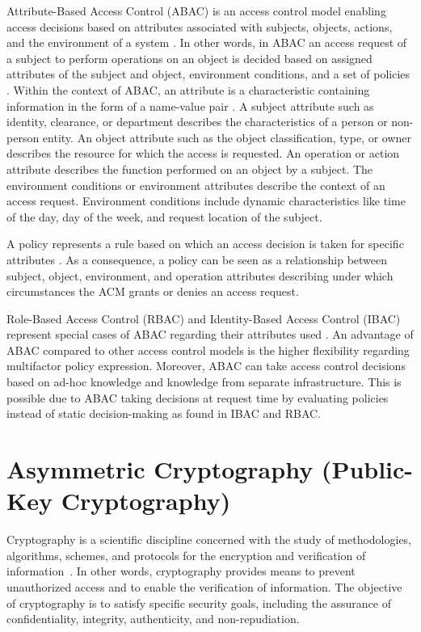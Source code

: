 Attribute-Based Access Control (ABAC) is an access control model enabling access decisions based on attributes associated with subjects, objects, actions, and the environment of a system \cite{JTF2020}.
In other words, in ABAC an access request of a subject to perform operations on an object is decided based on assigned attributes of the subject and object, environment conditions, and a set of policies \cite{Hu2014}.
Within the context of ABAC, an attribute is a characteristic containing information in the form of a name-value pair \cite{Hu2014}.
A subject attribute such as identity, clearance, or department describes the characteristics of a person or non-person entity.
An object attribute such as the object classification, type, or owner describes the resource for which the access is requested.
An operation or action attribute describes the function performed on an object by a subject.
The environment conditions or environment attributes describe the context of an access request.
Environment conditions include dynamic characteristics like time of the day, day of the week, and request location of the subject.

A policy represents a rule based on which an access decision is taken for specific attributes \cite{Hu2014}.
As a consequence, a policy can be seen as a relationship between subject, object, environment, and operation attributes describing under which circumstances the ACM grants or denies an access request.

Role-Based Access Control (RBAC) and Identity-Based Access Control (IBAC) represent special cases of ABAC regarding their attributes used \cite{Hu2014}.
An advantage of ABAC compared to other access control models is the higher flexibility regarding multifactor policy expression.
Moreover, ABAC can take access control decisions based on ad-hoc knowledge and knowledge from separate infrastructure.
This is possible due to ABAC taking decisions at request time by evaluating policies instead of static decision-making as found in IBAC and RBAC.

\section{Asymmetric Cryptography (Public-Key Cryptography)}
\label{sec:fundamentals:cryptography}
Cryptography is a scientific discipline concerned with the study of methodologies, algorithms, schemes, and protocols for the encryption and verification of information~\cite{Barker2016,Barker2020,CNSS2022}.
In other words, cryptography provides means to prevent unauthorized access and to enable the verification of information.
The objective of cryptography is to satisfy specific security goals, including the assurance of confidentiality, integrity, authenticity, and non-repudiation.

